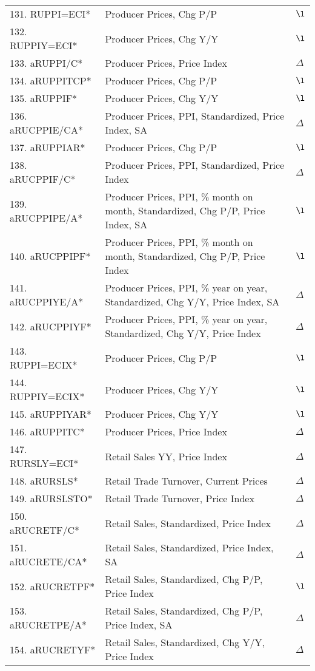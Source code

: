 \documentclass[a4paper, 14pt]{article}
\begin{document}
\begin{center}
\begin{longtable}{p{5.5cm} p{10cm} p{0.15cm}}
	131. RUPPI=ECI* &  Producer Prices, Chg P/P & $\l$\\
	132. RUPPIY=ECI* &  Producer Prices, Chg Y/Y & $\l$\\
	133. aRUPPI/C* &  Producer Prices, Price Index & $\Delta$\\
	134. aRUPPITCP* &  Producer Prices, Chg P/P & $\l$\\
	135. aRUPPIF* &  Producer Prices, Chg Y/Y & $\l$\\
	136. aRUCPPIE/CA* &  Producer Prices, PPI, Standardized, Price Index, SA & $\Delta$\\
	137. aRUPPIAR* &  Producer Prices, Chg P/P & $\l$\\
	138. aRUCPPIF/C* &  Producer Prices, PPI, Standardized, Price Index & $\Delta$\\
	139. aRUCPPIPE/A* &  Producer Prices, PPI, \% month on month, Standardized, Chg P/P, Price Index, SA & $\l$\\
	140. aRUCPPIPF* &  Producer Prices, PPI, \% month on month, Standardized, Chg P/P, Price Index & $\l$\\
	141. aRUCPPIYE/A* &  Producer Prices, PPI, \% year on year, Standardized, Chg Y/Y, Price Index, SA & $\Delta$\\
	142. aRUCPPIYF* &  Producer Prices, PPI, \% year on year, Standardized, Chg Y/Y, Price Index & $\Delta$\\
	143. RUPPI=ECIX* &  Producer Prices, Chg P/P & $\l$\\
	144. RUPPIY=ECIX* &  Producer Prices, Chg Y/Y & $\l$\\
	145. aRUPPIYAR* &  Producer Prices, Chg Y/Y & $\l$\\
	146. aRUPPITC* &  Producer Prices, Price Index & $\Delta$\\
	147. RURSLY=ECI* &  Retail Sales YY, Price Index & $\Delta$\\
	148. aRURSLS* &  Retail Trade Turnover, Current Prices & $\Delta$\\
	149. aRURSLSTO* &  Retail Trade Turnover, Price Index & $\Delta$\\
	150. aRUCRETF/C* &  Retail Sales, Standardized, Price Index & $\Delta$\\
	151. aRUCRETE/CA* &  Retail Sales, Standardized, Price Index, SA & $\Delta$\\
	152. aRUCRETPF* &  Retail Sales, Standardized, Chg P/P, Price Index & $\l$\\
	153. aRUCRETPE/A* &  Retail Sales, Standardized, Chg P/P, Price Index, SA & $\Delta$\\
	154. aRUCRETYF* &  Retail Sales, Standardized, Chg Y/Y, Price Index & $\Delta$\\

\end{longtable}
\end{center}
\end{document}
